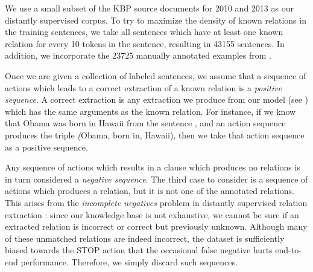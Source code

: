 We use a small subset of the KBP source documents for 
  2010 \cite{key:2010ji-kbpoverview}
  and 2013 \cite{key:2013surdeanu-kbpoverview}
  as our distantly supervised corpus.
To try to maximize the density of known relations in the training sentences,
  we take all sentences which have at least one known
  relation for every 10 tokens in the sentence,
  resulting in \num{43155} sentences.
In addition, we incorporate the \num{23725} manually annotated examples
  from .

Once we are given a collection of labeled sentences, 
  we assume that a sequence of actions which leads to a correct extraction of
  a known relation is a \textit{positive sequence}.
A correct extraction is any extraction we produce from our model
  (see ) which has the same arguments as the known
  relation.
For instance, if we know that Obama was born in Hawaii from the sentence
  , and an action sequence produces the triple
  \textit(Obama, born in, Hawaii), then we take that action sequence as
  a positive sequence.

Any sequence of actions which results in a clause which produces no relations
  is in turn considered a \textit{negative sequence}.
%
The third case to consider is a sequence of actions which produces a relation,
  but it is not one of the annotated relations.
This arises from the \textit{incomplete negatives} problem in distantly
  supervised relation extraction \cite{key:2013min-incomplete}: 
  since our knowledge base is not exhaustive,
  we cannot be sure if an extracted relation is incorrect or correct but
  previously unknown.
Although many of these unmatched relations are indeed incorrect, the dataset
  is sufficiently biased towards the STOP action that the occasional
  false negative hurts end-to-end performance.
Therefore, we simply discard such sequences.

